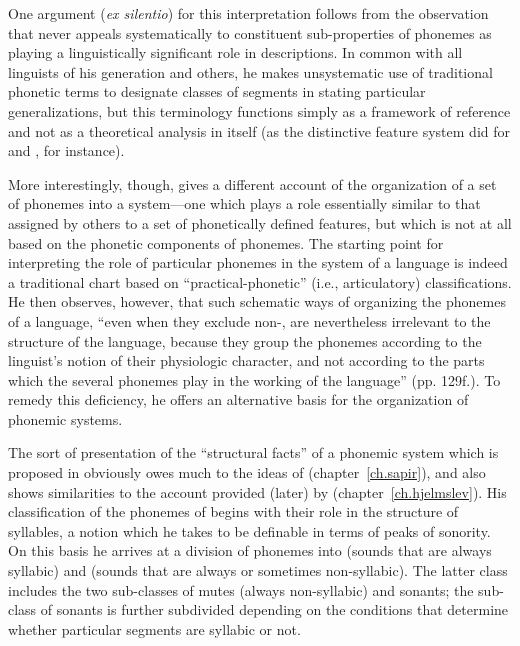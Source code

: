 One argument (\emph{ex silentio}) for this interpretation follows from
the observation that {\Bloomfield} never appeals systematically to
constituent sub-properties of phonemes as playing a linguistically
significant role in descriptions. In common with all linguists of his
generation and others, he makes unsystematic use of traditional
phonetic terms to designate classes of segments in stating particular
generalizations, but this terminology functions simply as a framework
of reference and not as a theoretical analysis in itself (as the
distinctive feature system did for {\Trubetzkoy} and {\Jakobson}, for
instance).

More interestingly, though, {\Bloomfield} gives a different account of
the organization of a set of phonemes into a system—one which plays a
role essentially similar to that assigned by others to a set of
phonetically defined features, but which is not at all based on the
phonetic components of phonemes. The starting point for interpreting
the role of particular phonemes in the system of a language is indeed
a traditional chart based on ``practical-phonetic'' (i.e., articulatory)
classifications. He then observes, however, that such schematic ways
of organizing the phonemes of a language, ``even when they exclude
non-, are nevertheless irrelevant to the structure
of the language, because they group the phonemes according to the
linguist's notion of their physiologic character, and not according to
the parts which the several phonemes play in the working of the
language'' (pp. 129f.). To remedy this deficiency, he offers an
alternative basis for the organization of phonemic systems.

The sort of presentation of the ``structural facts'' of a phonemic
system which is proposed in \citealt[ch. 8, ``Phonetic
Structure'']{bloomfield:lg} obviously owes much to the ideas of {\Sapir}
(chapter~\ref{ch.sapir}), and also shows similarities to the account
provided (later) by {\Hjelmslev} (chapter~\ref{ch.hjelmslev}). His
classification of the phonemes of  begins with their role in
the structure of syllables, a notion which he takes to be definable in
terms of peaks of sonority. On this basis he arrives at a division of
phonemes into  (sounds that are always syllabic) and 
(sounds that are always or sometimes non-syllabic). The latter class
includes the two sub-classes of mutes (always non-syllabic) and sonants;
the sub-class of sonants is further subdivided depending on the
conditions that determine whether particular segments are syllabic or
not.

